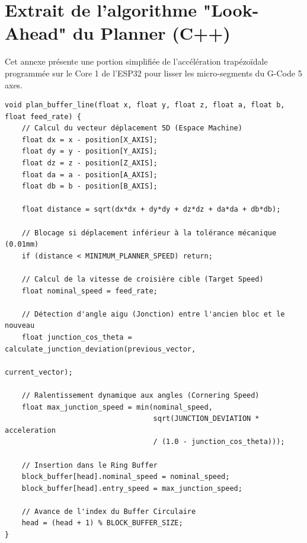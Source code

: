 \section{Extrait de l'algorithme "Look-Ahead" du Planner (C++)}
Cet annexe présente une portion simplifiée de l'accélération trapézoïdale programmée sur le Core 1 de l'ESP32 pour lisser les micro-segments du G-Code 5 axes.

\begin{tcolorbox}[colback=white, colframe=macouleur, title=Planner.cpp (Extrait)]
\begin{verbatim}
void plan_buffer_line(float x, float y, float z, float a, float b, float feed_rate) {
    // Calcul du vecteur déplacement 5D (Espace Machine)
    float dx = x - position[X_AXIS];
    float dy = y - position[Y_AXIS];
    float dz = z - position[Z_AXIS];
    float da = a - position[A_AXIS];
    float db = b - position[B_AXIS];

    float distance = sqrt(dx*dx + dy*dy + dz*dz + da*da + db*db);

    // Blocage si déplacement inférieur à la tolérance mécanique (0.01mm)
    if (distance < MINIMUM_PLANNER_SPEED) return;

    // Calcul de la vitesse de croisière cible (Target Speed)
    float nominal_speed = feed_rate;
    
    // Détection d'angle aigu (Jonction) entre l'ancien bloc et le nouveau
    float junction_cos_theta = calculate_junction_deviation(previous_vector,
                                                            current_vector);
                                                            
    // Ralentissement dynamique aux angles (Cornering Speed)
    float max_junction_speed = min(nominal_speed, 
                                   sqrt(JUNCTION_DEVIATION * acceleration 
                                   / (1.0 - junction_cos_theta)));

    // Insertion dans le Ring Buffer
    block_buffer[head].nominal_speed = nominal_speed;
    block_buffer[head].entry_speed = max_junction_speed;
    
    // Avance de l'index du Buffer Circulaire
    head = (head + 1) % BLOCK_BUFFER_SIZE;
}
\end{verbatim}
\end{tcolorbox}
